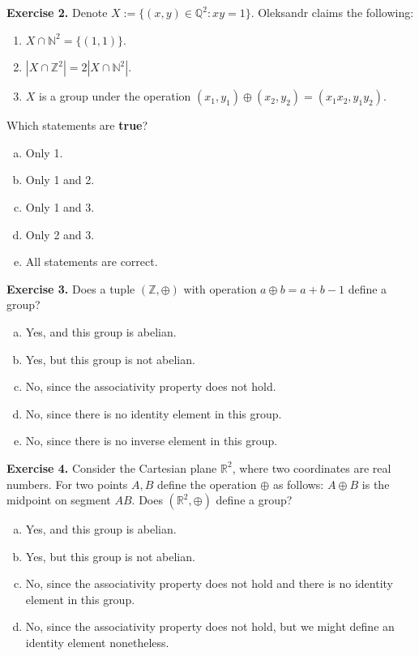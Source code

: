 \documentclass[../lecture-notes.tex]{subfiles}
\begin{document}
\textbf{Exercise 2.} Denote $X := \{(x,y) \in \mathbb{Q}^2: xy = 1\}$. Oleksandr claims the following:
\begin{enumerate}
    \item $X \cap \mathbb{N}^2 = \{(1,1)\}$. 
    \item $|X \cap \mathbb{Z}^2| = 2|X \cap \mathbb{N}^2|$.
    \item $X$ is a group under the operation $(x_1,y_1) \oplus (x_2,y_2) = (x_1x_2, y_1y_2)$.
\end{enumerate}

Which statements are \textbf{true}?
\begin{enumerate}[a)]
    \item Only 1.
    \item Only 1 and 2.
    \item Only 1 and 3.
    \item Only 2 and 3.
    \item All statements are correct.
\end{enumerate}

\textbf{Exercise 3.} Does a tuple $(\mathbb{Z},\oplus)$ with operation $a \oplus b = a + b - 1$ define a group?
\begin{enumerate}[a)]
    \item Yes, and this group is abelian.
    \item Yes, but this group is not abelian.
    \item No, since the associativity property does not hold.
    \item No, since there is no identity element in this group.
    \item No, since there is no inverse element in this group.
\end{enumerate}

\textbf{Exercise 4.} Consider the Cartesian plane $\mathbb{R}^2$, where two coordinates are real numbers. For two points $A,B$ define the operation $\oplus$
as follows: $A \oplus B$ is the midpoint on segment $AB$. Does $(\mathbb{R}^2, \oplus)$ define a group? 
\begin{enumerate}[a)]
    \item Yes, and this group is abelian.
    \item Yes, but this group is not abelian.
    \item No, since the associativity property does not hold and there is no identity element in this group.
    \item No, since the associativity property does not hold, but we might define an identity element nonetheless.
\end{enumerate}
\end{document}
